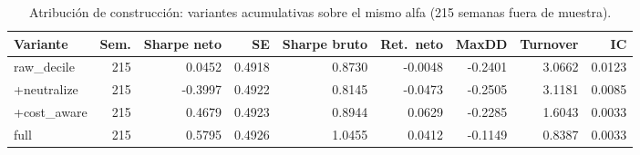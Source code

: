 \begin{table}[htbp]
\centering
\caption{Atribución de construcción: variantes acumulativas sobre el mismo alfa
(215 semanas fuera de muestra).}
\label{tab:weekly-attribution}
\small
\setlength{\tabcolsep}{4pt}
\begin{tabular}{lrrrrrrrr}
\toprule
Variante & Sem. & Sharpe neto & SE & Sharpe bruto & Ret.\ neto & MaxDD & Turnover & IC \\
\midrule
raw\_decile & 215 & 0.0452 & 0.4918 & 0.8730 & -0.0048 & -0.2401 & 3.0662 & 0.0123 \\
+neutralize & 215 & -0.3997 & 0.4922 & 0.8145 & -0.0473 & -0.2505 & 3.1181 & 0.0085 \\
+cost\_aware & 215 & 0.4679 & 0.4923 & 0.8944 & 0.0629 & -0.2285 & 1.6043 & 0.0033 \\
full & 215 & 0.5795 & 0.4926 & 1.0455 & 0.0412 & -0.1149 & 0.8387 & 0.0033 \\
\bottomrule
\end{tabular}
\end{table}

